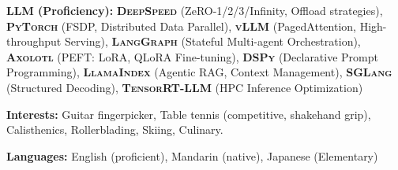 \documentclass[10pt, letterpaper]{article}
\begin{document}
\vspace{0.15cm}
\textbf{LLM (Proficiency):} \textbf{\textsc{DeepSpeed}} (ZeRO-1/2/3/Infinity,
Offload strategies), \textbf{\textsc{PyTorch}} (FSDP, Distributed Data Parallel),
\textbf{\textsc{vLLM}} (PagedAttention, High-throughput Serving),
\textbf{\textsc{LangGraph}} (Stateful Multi-agent Orchestration),
\textbf{\textsc{Axolotl}} (PEFT: LoRA, QLoRA Fine-tuning), \textbf{\textsc{DSPy}}
(Declarative Prompt Programming), \textbf{\textsc{LlamaIndex}} (Agentic RAG,
Context Management), \textbf{\textsc{SGLang}} (Structured Decoding),
\textbf{\textsc{TensorRT}-LLM} (HPC Inference Optimization)

\vspace{0.15cm}
\textbf{Interests:} Guitar fingerpicker, Table tennis (competitive, shakehand
grip), Calisthenics, Rollerblading, Skiing, Culinary.

\vspace{0.15cm}
\textbf{Languages:} English (proficient), Mandarin (native), Japanese
(Elementary)

\end{document}
